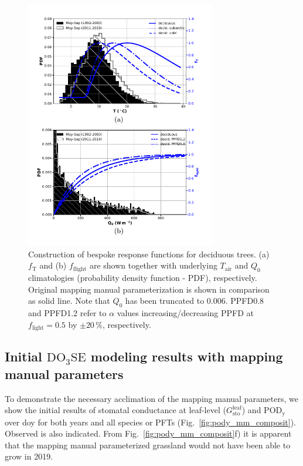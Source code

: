 \documentclass[bg, manuscript]{copernicus}
\begin{document}
\begin{figure}[t]
  \includegraphics[width=8.3cm]{figB3}
\caption{Construction of bespoke response functions for deciduous trees. (a) $f_\mathrm{T}$ and (b) $f_\mathrm{flight}$ are shown together with underlying $T_\mathrm{air}$ and $Q_0$ climatologies (probability density function - PDF), respectively. Original mapping manual parameterization is shown in comparison as solid line. Note that $Q_0$ has been truncated to $0.006$. PPFD0.8 and PPFD1.2 refer to $\alpha$ values increasing/decreasing PPFD at $f_\mathrm{light}=0.5$ by $\pm 20\,\%$, respectively.}
\label{fig:f_temp_birch}
\end{figure}

\subsection{Initial $\mathrm{DO_3SE}$ modeling results with mapping manual parameters}
To demonstrate the necessary acclimation of the mapping manual parameters, we show the initial results of stomatal conductance at leaf-level ($G_\mathrm{sto}^\mathrm{leaf}$) and $\mathrm{POD_y}$ over \unit{doy} for both years and all species or PFTs (Fig.~\ref{fig:pody_mm_composit}). Observed \chem{[O_3]} is also indicated. From Fig.~\ref{fig:pody_mm_composit}f) it is apparent that the mapping manual parameterized grassland would not have been able to grow in 2019.
\end{document}
